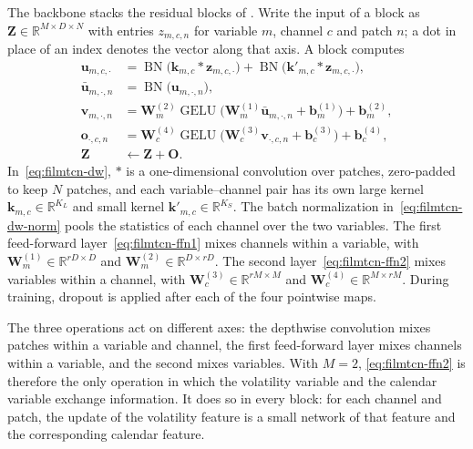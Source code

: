 The backbone stacks the residual blocks of \citet{luo2024moderntcn}. Write the
input of a block as $\mathbf{Z}\in\mathbb{R}^{M\times D\times N}$ with entries
$z_{m,c,n}$ for variable $m$, channel $c$ and patch $n$; a dot in place of an
index denotes the vector along that axis. A block computes
\begin{align}
  \mathbf{u}_{m,c,\cdot}
    &= \operatorname{BN}\bigl(\mathbf{k}_{m,c} * \mathbf{z}_{m,c,\cdot}\bigr)
     + \operatorname{BN}\bigl(\mathbf{k}'_{m,c} * \mathbf{z}_{m,c,\cdot}\bigr),
     \label{eq:filmtcn-dw}\\
  \bar{\mathbf{u}}_{m,\cdot,n}
    &= \operatorname{BN}\bigl(\mathbf{u}_{m,\cdot,n}\bigr),
     \label{eq:filmtcn-dw-norm}\\
  \mathbf{v}_{m,\cdot,n}
    &= \mathbf{W}^{(2)}_{m}\operatorname{GELU}\bigl(\mathbf{W}^{(1)}_{m}
       \bar{\mathbf{u}}_{m,\cdot,n} + \mathbf{b}^{(1)}_{m}\bigr)
     + \mathbf{b}^{(2)}_{m},
     \label{eq:filmtcn-ffn1}\\
  \mathbf{o}_{\cdot,c,n}
    &= \mathbf{W}^{(4)}_{c}\operatorname{GELU}\bigl(\mathbf{W}^{(3)}_{c}
       \mathbf{v}_{\cdot,c,n} + \mathbf{b}^{(3)}_{c}\bigr)
     + \mathbf{b}^{(4)}_{c},
     \label{eq:filmtcn-ffn2}\\
  \mathbf{Z} &\leftarrow \mathbf{Z} + \mathbf{O}.
     \label{eq:filmtcn-residual}
\end{align}
In~\eqref{eq:filmtcn-dw}, $*$ is a one-dimensional convolution over patches,
zero-padded to keep $N$ patches, and each variable--channel pair has its own
large kernel $\mathbf{k}_{m,c}\in\mathbb{R}^{K_L}$ and small kernel
$\mathbf{k}'_{m,c}\in\mathbb{R}^{K_S}$. The batch normalization
in~\eqref{eq:filmtcn-dw-norm} pools the statistics of each channel over the two
variables. The first feed-forward layer~\eqref{eq:filmtcn-ffn1} mixes channels
within a variable, with $\mathbf{W}^{(1)}_m\in\mathbb{R}^{rD\times D}$ and
$\mathbf{W}^{(2)}_m\in\mathbb{R}^{D\times rD}$. The second
layer~\eqref{eq:filmtcn-ffn2} mixes variables within a channel, with
$\mathbf{W}^{(3)}_c\in\mathbb{R}^{rM\times M}$ and
$\mathbf{W}^{(4)}_c\in\mathbb{R}^{M\times rM}$. During training, dropout is
applied after each of the four pointwise maps.

The three operations act on different axes: the depthwise convolution mixes
patches within a variable and channel, the first feed-forward layer mixes
channels within a variable, and the second mixes variables. With $M=2$,
\eqref{eq:filmtcn-ffn2} is therefore the only operation in which the volatility
variable and the calendar variable exchange information. It does so in every
block: for each channel and patch, the update of the volatility feature is a
small network of that feature and the corresponding calendar feature.

